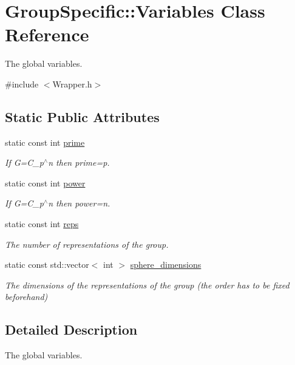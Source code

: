 \hypertarget{classGroupSpecific_1_1Variables}{}\section{Group\+Specific\+:\+:Variables Class Reference}
\label{classGroupSpecific_1_1Variables}


The global variables.  




{\ttfamily \#include $<$Wrapper.\+h$>$}

\subsection*{Static Public Attributes}
\begin{DoxyCompactItemize}
\item 
static const int \hyperlink{classGroupSpecific_1_1Variables_a38586ec998bcbfdf325e6cfc6598b54b}{prime}
\begin{DoxyCompactList}\small\item\em If G=C\+\_\+p$^\wedge$n then prime=p. \end{DoxyCompactList}\item 
static const int \hyperlink{classGroupSpecific_1_1Variables_ac9bd6be19cc41e6877ee25a2d1c7be80}{power}
\begin{DoxyCompactList}\small\item\em If G=C\+\_\+p$^\wedge$n then power=n. \end{DoxyCompactList}\item 
static const int \hyperlink{classGroupSpecific_1_1Variables_a5504789b0b60050e6ea223fdeb84874a}{reps}
\begin{DoxyCompactList}\small\item\em The number of representations of the group. \end{DoxyCompactList}\item 
static const std\+::vector$<$ int $>$ \hyperlink{classGroupSpecific_1_1Variables_a4746f16736abcf4c705dd8690ec12ca0}{sphere\+\_\+dimensions}
\begin{DoxyCompactList}\small\item\em The dimensions of the representations of the group (the order has to be fixed beforehand) \end{DoxyCompactList}\end{DoxyCompactItemize}


\subsection{Detailed Description}
The global variables. 

